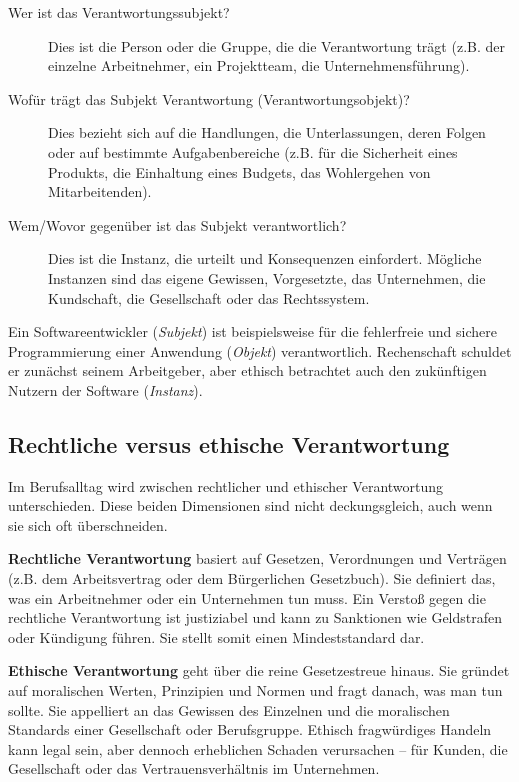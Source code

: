 \documentclass[
    12pt,               %
    a4paper,            %
    ngerman             %
]{scrartcl}
\begin{document}
\begin{description}
    \item[Wer ist das Verantwortungssubjekt?] Dies ist die Person oder die Gruppe, die die Verantwortung trägt (z.B. der einzelne Arbeitnehmer, ein Projektteam, die Unternehmensführung).
    \item[Wofür trägt das Subjekt Verantwortung (Verantwortungsobjekt)?] Dies bezieht sich auf die Handlungen, die Unterlassungen, deren Folgen oder auf bestimmte Aufgabenbereiche (z.B. für die Sicherheit eines Produkts, die Einhaltung eines Budgets, das Wohlergehen von Mitarbeitenden).
    \item[Wem/Wovor gegenüber ist das Subjekt verantwortlich?] Dies ist die Instanz, die urteilt und Konsequenzen einfordert. Mögliche Instanzen sind das eigene Gewissen, Vorgesetzte, das Unternehmen, die Kundschaft, die Gesellschaft oder das Rechtssystem.
\end{description}

Ein Softwareentwickler (\textit{Subjekt}) ist beispielsweise für die fehlerfreie und sichere Programmierung einer Anwendung (\textit{Objekt}) verantwortlich. Rechenschaft schuldet er zunächst seinem Arbeitgeber, aber ethisch betrachtet auch den zukünftigen Nutzern der Software (\textit{Instanz}).

\subsection{Rechtliche versus ethische Verantwortung} %
Im Berufsalltag wird zwischen rechtlicher und ethischer Verantwortung unterschieden. Diese beiden Dimensionen sind nicht deckungsgleich, auch wenn sie sich oft überschneiden.

\textbf{Rechtliche Verantwortung} basiert auf Gesetzen, Verordnungen und Verträgen (z.B. dem Arbeitsvertrag oder dem Bürgerlichen Gesetzbuch). Sie definiert das, was ein Arbeitnehmer oder ein Unternehmen tun muss. Ein Verstoß gegen die rechtliche Verantwortung ist justiziabel und kann zu Sanktionen wie Geldstrafen oder Kündigung führen. Sie stellt somit einen Mindeststandard dar.

\textbf{Ethische Verantwortung} geht über die reine Gesetzestreue hinaus. Sie gründet auf moralischen Werten, Prinzipien und Normen und fragt danach, was man tun sollte. Sie appelliert an das Gewissen des Einzelnen und die moralischen Standards einer Gesellschaft oder Berufsgruppe. Ethisch fragwürdiges Handeln kann legal sein, aber dennoch erheblichen Schaden verursachen – für Kunden, die Gesellschaft oder das Vertrauensverhältnis im Unternehmen.
\end{document}
